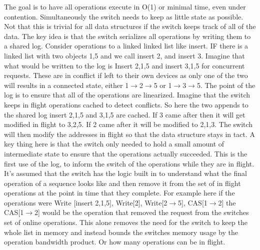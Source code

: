 The goal is to have all operations execute in
O(1) or minimal time, even under contention.  Simultaneously the switch needs
to keep as little state as possible. Not that this is trivial for all data
structures if the switch keeps track of all of the data. The key idea is that
the switch serializes all operations by writing them to a shared log. Consider
operations to a linked linked list like insert. IF there is a linked list with
two objects 1,5 and we call insert 2, and insert 3. Imagine that what would be
written to the log is Insert 2,1,5 and insert 3,1,5 for concurrent requests.
These are in conflict if left to their own devices as only one of the two will
results in a connected state, either 1$\rightarrow$2$\rightarrow$5 or 1$\rightarrow$3$\rightarrow$5. The point of the log is
to ensure that all of the operations are linearized. Imagine that the switch
keeps in flight operations cached to detect conflicts. So here the two appends
to the shared log insert 2,1,5 and 3,1,5 are cached. If 3 came after then it
will get modified in flight to 3,2,5. If 2 came after it will be modified to
2,1,3. The switch will then modify the addresses in flight so that the data
structure stays in tact. A key thing here is that the switch only needed to
hold a small amount of intermediate state to ensure that the operations
actually succeeded. This is the first use of the log, to inform the switch of
the operations while they are in flight. It's assumed that the switch has the
logic built in to understand what the final operation of a sequence looks like
and then remove it from the set of in flight operations at the point in time
that they complete. For example here if the operations were Write [insert
2,1,5], Write[2], Write[2$\rightarrow$5], CAS[1$\rightarrow$2] the CAS[1$\rightarrow$2] would be the operation
that removed the request from the switches set of online operations. This alone
removes the need for the switch to keep the whole list in memory and instead
bounds the switches memory usage by the operation bandwidth product. Or how many
operations can be in flight.

